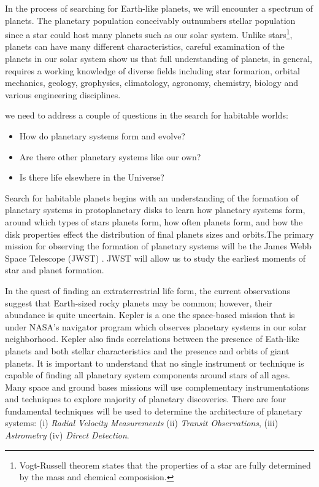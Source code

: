 In the process of searching for Earth-like planets, we will encounter a spectrum of planets. The planetary population conceivably outnumbers stellar population since a star could host many planets such as our solar system. Unlike stars\footnote{Vogt-Russell theorem states that the properties of a star are fully determined by the mass and chemical composision.}, planets can have many different characteristics, careful examination of the planets in our solar system show us that full understanding of planets, in general, requires a working knowledge of diverse fields including star formarion, orbital mechanics, geology, grophysics, climatology, agronomy, chemistry, biology and various engineering disciplines. 

we need to address a couple of questions in the search for habitable worlds:

\begin{itemize}
	\item How do planetary systems form and evolve?
	\item Are there other planetary systems like our own?
	\item Is there life elsewhere in the Universe?
\end{itemize}

Search for habitable planets begins with an understanding of the formation of planetary systems in protoplanetary disks to learn how planetary systems form, around which types of stars planets form, how often planets form, and how the disk properties effect the distribution of final planets sizes and orbits\cite{2002ApJ...580..494Y}.The primary mission for observing the formation of planetary systems will be the James Webb Space Telescope (JWST) \cite{Gardner2006}. JWST will allow us to study the earliest moments of star and planet formation. 

In the quest of finding an extraterrestrial life form, the current observations suggest that Earth-sized rocky planets may be common; however, their abundance is quite uncertain. Kepler is a one the space-based mission\cite{2010ApJ...713L..87J} that is under NASA's navigator program which observes planetary systems in our solar neighborhood. Kepler also finds correlations between the presence of Eath-like planets and both stellar characteristics and the presence and orbits of giant planets. It is important to understand that no single instrument or technique is capable of finding all planetary system components around stars of all ages. Many space and ground bases missions will use complementary instrumentations and techniques to explore majority of planetary discoveries. There are four fundamental techniques will be used to determine the architecture of planetary systems: (i) \emph{Radial Velocity Measurements} (ii) \emph{Transit Observations}, (iii) \emph{Astrometry} (iv) \emph{Direct Detection}.

